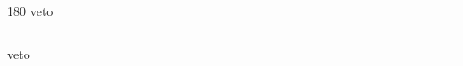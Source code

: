 
\begin{frame}
\begin{center}
\begin{turn}{180}
{\fontsize{2.5cm}{1em}\selectfont veto}
\end{turn}
\vspace{1em}\par  
\hrule
\vspace{1em}\par  
{\fontsize{2.5cm}{1em}\selectfont veto}
\end{center}
\end{frame}
